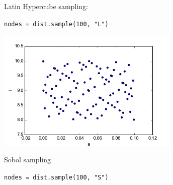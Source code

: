 \documentclass[handout]{beamer}
\begin{document}
\begin{frame}[fragile]
\begin{columns}
\begin{center}
                Latin Hypercube sampling:

                \scriptsize
                \verb;nodes = dist.sample(100, "L");
                \normalsize



                \includegraphics[width=0.65\textwidth]{samples_S.png}

                Sobol sampling

                \scriptsize
                \verb;nodes = dist.sample(100, "S");
                \normalsize
     \end{center}
 \end{columns}
\end{frame}
\end{document}
